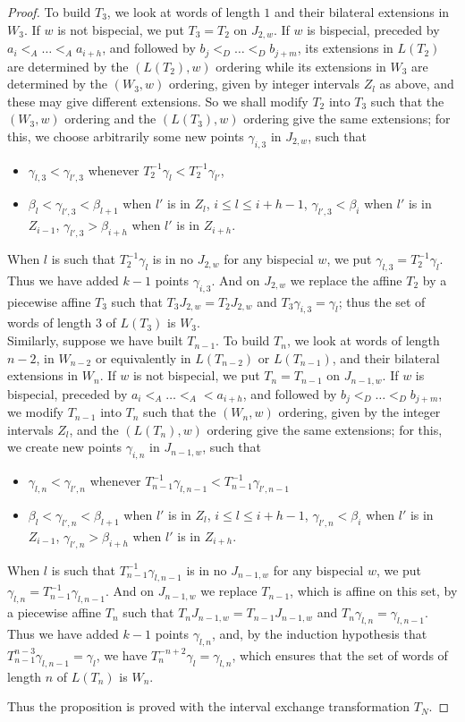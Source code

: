 \documentclass[10pt,a4paper]{amsart}
\begin{document}
\begin{proof}
To build $T_3$, we look at words of length $1$ and their bilateral extensions in $W_3$. If $w$ is not bispecial, we put $T_3=T_2$ on $J_{2,w}$. If $w$ is bispecial, preceded by $a_i<_A\ldots <_A a_{i+h}$, and followed by $b_j<_D\ldots <_D b_{j+m}$, its extensions in $L(T_2)$ are determined by the $(L(T_2),w)$ ordering
 while its extensions in $W_3$ are determined by the $(W_3, w)$ ordering, given by integer intervals $Z_l$ as above, and these may give different extensions. So we shall modify $T_2$ into $T_3$ such that  the $(W_3, w)$ ordering and the $(L(T_3), w)$ ordering  give the same extensions; for this, we choose arbitrarily some new points
  $\gamma_{i,3}$ in $J_{2,w}$, 
 such that 
 \begin{itemize}
 \item $\gamma_{l,3}<\gamma_{l',3}$ whenever $T_2^{-1}\gamma_l<T_2^{-1}\gamma_{l'}$,
 \item   $\beta_l<\gamma_{l',3}< \beta_{l+1}$ when $l'$ is in $Z_l$, $i\leq l\leq i+h-1$, $\gamma_{l',3}< \beta_i$ when $l'$ is in $Z_{i-1}$, $\gamma_{l',3}> \beta_{i+h}$ when $l'$ is in $Z_{i+h}$.
\end{itemize}
 When $l$ is such that $T_2^{-1}\gamma_l$ is in no $J_{2,w}$ for any bispecial $w$, we put $\gamma_{l,3}=T_2^{-1}\gamma_l$. Thus we  have added $k-1$ points $\gamma_{i,3}$. And on $J_{2,w}$ we replace the affine $T_2$ by  a piecewise affine $T_3$  such that  $T_3J_{2,w}=T_2J_{2,w}$ 
  and $T_3\gamma_{i,3}=\gamma_l$; thus  the set of words of length $3$ of $L(T_3)$ is $W_3$. \\

Similarly, suppose we have built $T_{n-1}$. To build $T_n$, we look at words of length $n-2$, in $W_{n-2}$  or equivalently in  $L(T_{n-2})$ or  $L(T_{n-1})$,  and their bilateral extensions in $W_n$. If $w$ is not bispecial, we put $T_n=T_{n-1}$ on $J_{n-1,w}$. If $w$ is bispecial, preceded by $a_i<_A\ldots <_A <a_{i+h}$, and followed by $b_j<_D\ldots <_D b_{j+m}$, we modify $T_{n-1}$ into $T_n$ such that  the $(W_n, w)$ ordering, given by the integer intervals $Z_l$, and the $(L(T_n), w)$ ordering  give the same extensions; for this, we create new points $\gamma_{i,n}$ in $J_{n-1,w}$, such 
that 
 \begin{itemize}
 \item $\gamma_{l,n}<\gamma_{l',n}$ whenever $T_{n-1}^{-1}\gamma_{l,n-1}<T_{n-1}^{-1}\gamma_{l',n-1}$ 
  \item   $\beta_l<\gamma_{l',n}< \beta_{l+1}$ when $l'$ is in $Z_l$, $i\leq l\leq i+h-1$, $\gamma_{l',n}< \beta_i$ when $l'$ is in $Z_{i-1}$, $\gamma_{l',n}> \beta_{i+h}$ when $l'$ is in $Z_{i+h}$.
\end{itemize}
When $l$ is such that $T_{n-1}^{-1}\gamma_{l,n-1}$ is in no $J_{n-1,w}$ for any bispecial $w$, we  put $\gamma_{l,n}=T_{n-1}^{-1}\gamma_{l,n-1}$. And on $J_{n-1,w}$ we replace $T_{n-1}$, which is affine on this set, by  a piecewise affine $T_n$  such that 
 $T_nJ_{n-1,w}=T_{n-1}J_{n-1,w}$  and $T_n\gamma_{l,n}=\gamma_{l,n-1}$. Thus we  have added $k-1$ points $\gamma_{l,n}$, and, by the induction hypothesis  that $T_{n-1}^{n-3}\gamma_{l,n-1}=\gamma_l$, we have   $T_n^{-n+2}\gamma_l=\gamma_{l,n}$, which ensures that  the set of words of length $n$ of $L(T_n)$ is $W_n$. 


Thus the proposition is proved with the interval exchange transformation $T_N$. \end{proof}
\end{document}

